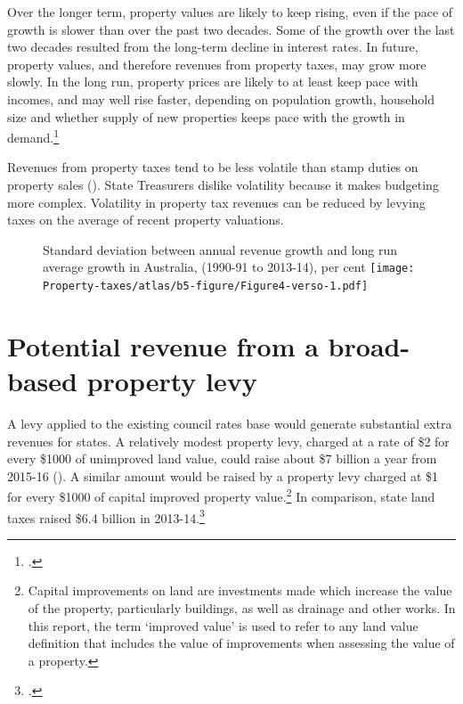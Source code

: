 \documentclass[twoside,english]{palatinob5ona4portrait}
\begin{document}
Over the longer term, property values are likely to keep rising, even if the pace of growth is slower than over the past two decades. Some of the growth over the last two decades resulted from the long-term decline in interest rates. In future, property values, and therefore revenues from property taxes, may grow more slowly.  In the long run, property prices are likely to at least keep pace with incomes, and may well rise faster, depending on population growth, household size and whether supply of new properties keeps pace with the growth in demand.\footcite[][6--7]{RBA2014SubmissionAffordableHousingInquiry}  

Revenues from property taxes tend to be less volatile than stamp duties on property sales (). State Treasurers dislike volatility because it makes budgeting more complex. Volatility in property tax revenues can be reduced by levying taxes on the average of recent property valuations. 



\begin{figure}[h]
%
{Standard deviation between annual revenue growth and long run average growth in Australia, (1990-91 to 2013-14), per cent}
\texttt{[image: Property-taxes/atlas/b5-figure/Figure4-verso-1.pdf]}

\end{figure}
\section{Potential revenue from a broad-based property levy\label{sec:PROP-3-3}}
A levy applied to the existing council rates base would generate substantial extra revenues for states. A relatively modest property levy, charged at a rate of \$2 for every \$1000 of unimproved land value, could raise about \$7 billion a year from 2015-16 (). A similar amount would be raised by a property levy charged at \$1 for every \$1000 of capital improved property value.\footnote{Capital improvements on land are investments made which increase the value of the property, particularly buildings, as well as drainage and other works. In this report, the term ‘improved value’ is used to refer to any land value definition that includes the value of improvements when assessing the value of a property.}   In comparison, state land taxes raised \$6.4 billion in 2013-14.\footcite{ABS2015h} 
\end{document}
